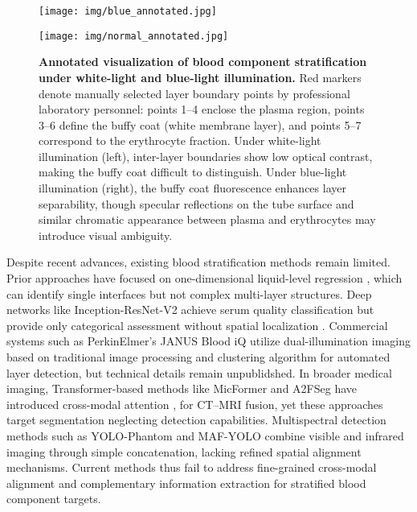 \begin{figure}[!t]
\centering

\newlength{\sepM}\setlength{\sepM}{10pt}      %
\newlength{\colw}\setlength{\colw}{0.45\linewidth} %
\newlength{\imgheight}

\begin{minipage}[t]{\colw}
  \centering
  \texttt{[image: img/blue\_annotated.jpg]}%
  \\
  \vspace{3pt}
\end{minipage}
\begin{minipage}[t]{\colw}
  \centering
  \texttt{[image: img/normal\_annotated.jpg]}\\
  \vspace{3pt}
\end{minipage}

\vspace{5pt}
\caption{\textbf{Annotated visualization of blood component stratification under white-light and blue-light illumination.}
Red markers denote manually selected layer boundary points by professional laboratory personnel: points 1–4 enclose the plasma region, points 3–6 define the buffy coat (white membrane layer), and points 5–7 correspond to the erythrocyte fraction. 
Under white-light illumination (left), inter-layer boundaries show low optical contrast, making the buffy coat difficult to distinguish. 
Under blue-light illumination (right), the buffy coat fluorescence enhances layer separability, though specular reflections on the tube surface and similar chromatic appearance between plasma and erythrocytes may introduce visual ambiguity.}
\label{fig:annotated images}
\end{figure}

Despite recent advances, existing blood stratification methods remain limited. Prior approaches have focused on one-dimensional liquid-level regression \cite{onedim}, which can identify single interfaces but not complex multi-layer structures. Deep networks like Inception-ResNet-V2 achieve serum quality classification but provide only categorical assessment without spatial localization \cite{ResNet}. Commercial systems such as PerkinElmer's JANUS Blood iQ utilize dual-illumination imaging based on traditional image processing and clustering algorithm for automated layer detection, but technical details remain unpublidshed. In broader medical imaging, Transformer-based methods like MicFormer \cite{micformer} and A2FSeg \cite{a2f} have introduced cross-modal attention \cite{crossmodal_1}, \cite{crossmodal_2} for CT–MRI fusion, yet these approaches target segmentation neglecting detection capabilities. Multispectral detection methods such as YOLO-Phantom \cite{phantom} and MAF-YOLO \cite{maf} combine visible and infrared imaging through simple concatenation, lacking refined spatial alignment mechanisms. Current methods thus fail to address fine-grained cross-modal alignment and complementary information extraction for stratified blood component targets.

